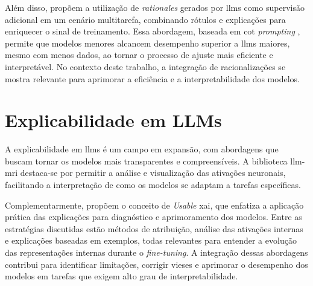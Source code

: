 Além disso, \cite{hsieh2023distillingstepbystep} propõem a utilização de \textit{rationales} gerados por \gls{llms} como supervisão adicional em um cenário multitarefa, combinando rótulos e explicações para enriquecer o sinal de treinamento. Essa abordagem, baseada em \gls{cot} \textit{prompting} \cite{wei2023chainofthought}, permite que modelos menores alcancem desempenho superior a \gls{llms} maiores, mesmo com menos dados, ao tornar o processo de ajuste mais eficiente e interpretável. No contexto deste trabalho, a integração de racionalizações se mostra relevante para aprimorar a eficiência e a interpretabilidade dos modelos.

\section{Explicabilidade em LLMs}

A explicabilidade em \gls{llms} é um campo em expansão, com abordagens que buscam tornar os modelos mais transparentes e compreensíveis. A biblioteca \gls{llm-mri} \cite{costa2024llmmri} destaca-se por permitir a análise e visualização das ativações neuronais, facilitando a interpretação de como os modelos se adaptam a tarefas específicas.

Complementarmente, \cite{wu2025usablexai10strategies} propõem o conceito de \textit{Usable} \gls{xai}, que enfatiza a aplicação prática das explicações para diagnóstico e aprimoramento dos modelos. Entre as estratégias discutidas estão métodos de atribuição, análise das ativações internas e explicações baseadas em exemplos, todas relevantes para entender a evolução das representações internas durante o \textit{fine-tuning}. A integração dessas abordagens contribui para identificar limitações, corrigir vieses e aprimorar o desempenho dos modelos em tarefas que exigem alto grau de interpretabilidade.
